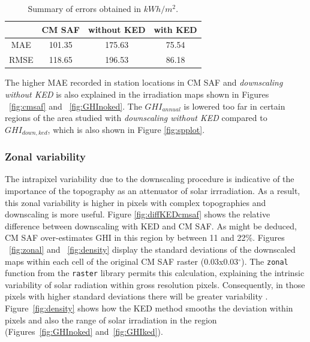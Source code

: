 \documentclass[11pt, english]{article}
\begin{document}
\begin{table}[ht]
\begin{center}
\begin{tabular}{cccc}
  \hline
& CM SAF & without KED & with KED\\
\hline
MAE & 101.35 &  175.63& 75.54  \\ 
  RMSE & 118.65  & 196.53 & 86.18 \\ 
   \hline
\end{tabular}
\end{center}
\caption{Summary of errors obtained in $kWh/m^2$.}
\label{tab:ers}
\end{table}


The higher MAE recorded in station locations in CM SAF and
\emph{downscaling without KED} is also explained in the irradiation
maps shown in Figures ~\ref{fig:cmsaf} and ~\ref{fig:GHInoked}. The
$GHI_{annual}$ is lowered too far in certain regions of the area
studied with \emph{downscaling without KED} compared to
$GHI_{down,ked}$, which is also shown in Figure \ref{fig:spplot}.


\subsubsection{Zonal variability}
\label{sec:zonal-variation}

The intrapixel variability due to the downscaling procedure is
indicative of the importance of the topography as an attenuator of
solar irrradiation. As a result, this zonal variability is higher in
pixels with complex topographies and downscaling is more
useful. Figure \ref{fig:diffKEDcmsaf} shows the relative difference
between downscaling with KED and CM SAF. As might be deduced, CM SAF
over-estimates GHI in this region by between 11 and 22\%. Figures
~\ref{fig:zonal} and ~\ref{fig:density} display the standard
deviations of the downscaled maps within each cell of the original CM
SAF raster (0.03x0.03$^\circ$). The \texttt{zonal} function from the
\texttt{raster} library permits this calculation, explaining the
intrinsic variability of solar radiation within gross resolution
pixels. Consequently, in those pixels with higher standard deviations
there will be greater variability . Figure~\ref{fig:density} shows how
the KED method smooths the deviation within pixels and also the range
of solar irradiation in the region (Figures~\ref{fig:GHInoked}
and~\ref{fig:GHIked}).
\end{document}
